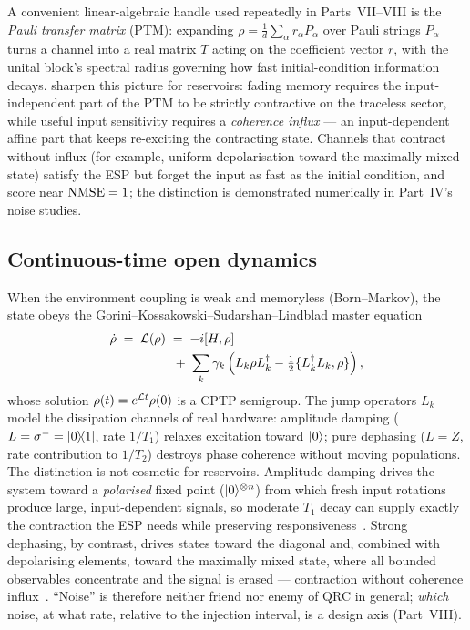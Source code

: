 A convenient linear-algebraic handle used repeatedly in Parts~VII--VIII is the
\emph{Pauli transfer matrix} (PTM): expanding
$\rho = \tfrac1d\sum_\alpha r_\alpha P_\alpha$ over Pauli strings $P_\alpha$
turns a channel into a real matrix $T$ acting on the coefficient vector $r$,
with the unital block's spectral radius governing how fast initial-condition
information decays. \citet{kobayashi2024coherence} sharpen this picture for
reservoirs: fading memory requires the input-independent part of the PTM to be
strictly contractive on the traceless sector, while useful input sensitivity
requires a \emph{coherence influx} --- an input-dependent affine part that keeps
re-exciting the contracting state. Channels that contract without influx (for
example, uniform depolarisation toward the maximally mixed state) satisfy the
ESP but forget the input as fast as the initial condition, and score near
$\mathrm{NMSE}=1$; the distinction is demonstrated numerically in
Part~IV's noise studies.

\subsection{Continuous-time open dynamics}

When the environment coupling is weak and memoryless (Born--Markov), the state
obeys the Gorini--Kossakowski--Sudarshan--Lindblad master
equation~\citep{lindblad1976generators,gorini1976completely}
\begin{equation}
\begin{aligned}
  \dot\rho \;=\; \mathcal{L}(\rho)
  \;&=\; -i[H,\rho]\\
  &\;+\; \sum_k \gamma_k \left( L_k \rho L_k^\dagger
        - \tfrac12\{L_k^\dagger L_k, \rho\} \right),
\end{aligned}
  \label{eq:lindblad}
\end{equation}
whose solution $\rho(t) = e^{\mathcal{L}t}\rho(0)$ is a CPTP semigroup. The jump
operators $L_k$ model the dissipation channels of real hardware: amplitude
damping ($L = \sigma^- = |0\rangle\!\langle1|$, rate $1/T_1$) relaxes excitation
toward $|0\rangle$; pure dephasing ($L = Z$, rate contribution to $1/T_2$)
destroys phase coherence without moving populations. The distinction is not
cosmetic for reservoirs. Amplitude damping drives the system toward a
\emph{polarised} fixed point ($|0\rangle^{\otimes n}$) from which fresh input
rotations produce large, input-dependent signals, so moderate $T_1$ decay can
supply exactly the contraction the ESP needs while preserving
responsiveness~\citep{sannia2024dissipation,domingo2022optimal}. Strong
dephasing, by contrast, drives states toward the diagonal and, combined with
depolarising elements, toward the maximally mixed state, where all bounded
observables concentrate and the signal is erased --- contraction without
coherence influx~\citep{kobayashi2024coherence,xiong2025role}. ``Noise'' is
therefore neither friend nor enemy of QRC in general; \emph{which} noise, at
what rate, relative to the injection interval, is a design axis
(Part~VIII).

